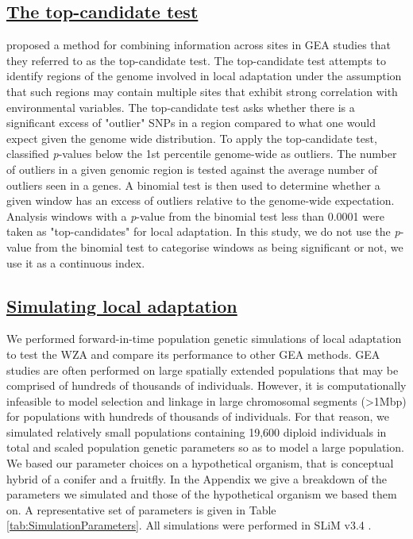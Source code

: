 \documentclass[10pt,twoside,lineno, twocolumn]{GSA_format}
\begin{document}
\subsection{\underline{The top-candidate test}} 

\citep{Yeaman2016} proposed a method for combining information across sites in GEA studies that they referred to as the top-candidate test. The top-candidate test attempts to identify regions of the genome involved in local adaptation under the assumption that such regions may contain multiple sites that exhibit strong correlation with environmental variables. The top-candidate test asks whether there is a significant excess of "outlier" SNPs in a region compared to what one would expect given the genome wide distribution. To apply the top-candidate test, \cite{Yeaman2016} classified \textit{p}-values below the 1st percentile genome-wide as outliers. The number of outliers in a given genomic region is tested against the average number of outliers seen in a genes. A binomial test is then used to determine whether a given window has an excess of outliers relative to the genome-wide expectation. Analysis windows with a \textit{p}-value from the binomial test less than 0.0001 were taken as "top-candidates" for local adaptation. In this study, we do not use the \textit{p}-value from the binomial test to categorise windows as being significant or not, we use it as a continuous index.


\subsection{\underline{Simulating local adaptation}} 

We performed forward-in-time population genetic simulations of local adaptation to test the WZA and compare its performance to other GEA methods. GEA studies are often performed on large spatially extended populations that may be comprised of hundreds of thousands of individuals. However, it is computationally infeasible to model selection and linkage in large chromosomal segments (>1Mbp) for populations with hundreds of thousands of individuals. For that reason, we simulated relatively small populations containing 19,600 diploid individuals in total and scaled population genetic parameters so as to model a large population. We based our parameter choices on a hypothetical organism, that is conceptual hybrid of a conifer and a fruitfly. In the Appendix we give a breakdown of the parameters we simulated and those of the hypothetical organism we based them on. A representative set of parameters is given in Table \ref{tab:SimulationParameters}. All simulations were performed in SLiM v3.4 \cite{Haller2019}. \\
\end{document}
